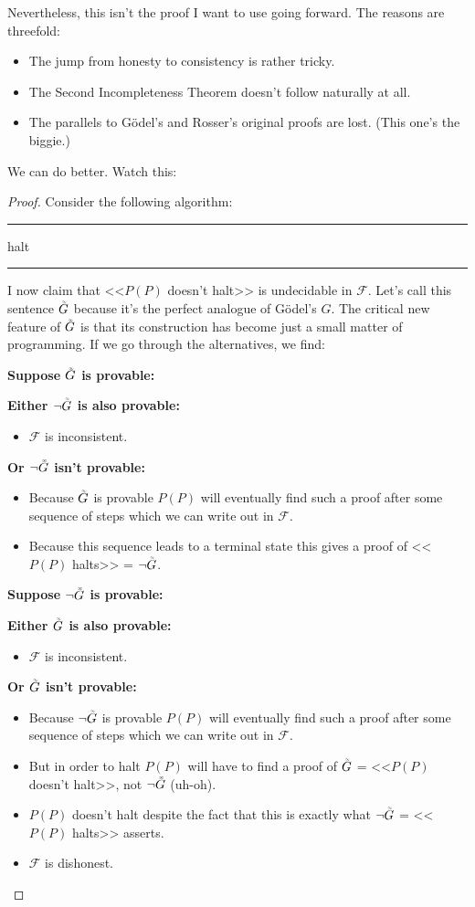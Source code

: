 \documentclass{article}
\newcommand{\nameditem}[1]{\item\textbf{#1}}
\newcommand{\impl}{\item[$\Rightarrow$]}
\newcommand{\F}{\ensuremath{\mathcal{F}}}
\newcommand{\iGoedel}{\ensuremath{\accentset{\scalebox{0.35}{$\infty$}}{G}}}
\newenvironment{algo}{\begin{samepage}\medskip\hrule\begin{algorithmic}[H]}{\end{algorithmic}\hrule\medskip\end{samepage}}
\begin{document}
Nevertheless, this isn't the proof I want to use going forward. The reasons are threefold:
\begin{itemize}
\item The jump from honesty to consistency is rather tricky.
\item The Second Incompleteness Theorem doesn't follow naturally at all.
\item The parallels to Gödel's and Rosser's original proofs are lost. (This one's the biggie.)
\end{itemize}
We can do better. Watch this:
\begin{proof}
Consider the following algorithm:
\begin{algo}
      \State halt
    \EndIf
  \EndFor
\EndFunction
\end{algo}
I now claim that <<$P(P)$ doesn't halt>> is undecidable in $\F$. Let's call this sentence $\iGoedel$ because it's the perfect analogue of Gödel's $G$. The critical new feature of $\iGoedel$ is that its construction has become just a small matter of programming. If we go through the alternatives, we find:
\begin{description}
\nameditem{Suppose $\iGoedel$ is provable:}
\begin{description}
\nameditem{Either $\neg \iGoedel$ is also provable:}
\begin{itemize}
\impl $\F$ is inconsistent. \lightning
\end{itemize}
\nameditem{Or $\neg \iGoedel$ isn't provable:}
\begin{itemize}
\impl Because $\iGoedel$ is provable $P(P)$ will eventually find such a proof after some sequence of steps which we can write out in $\F$.
\impl Because this sequence leads to a terminal state this gives a proof of <<$P(P)$ halts>> = $\neg \iGoedel$. \lightning
\end{itemize}
\end{description}
\nameditem{Suppose $\neg \iGoedel$ is provable:}
\begin{description}
\nameditem{Either $\iGoedel$ is also provable:}
\begin{itemize}
\impl $\F$ is inconsistent. \lightning
\end{itemize}
\nameditem{Or $\iGoedel$ isn't provable:}
\begin{itemize}
\impl Because $\neg \iGoedel$ is provable $P(P)$ will eventually find such a proof after some sequence of steps which we can write out in $\F$.
\impl But in order to halt $P(P)$ will have to find a proof of $\iGoedel$ = <<$P(P)$ doesn't halt>>, not $\neg \iGoedel$ (uh-oh).
\impl $P(P)$ doesn't halt despite the fact that this is exactly what $\neg \iGoedel$ = <<$P(P)$ halts>> asserts.
\impl $\F$ is dishonest. \lightning
\end{itemize}
\end{description}
\end{description}
\end{proof}
\end{document}
